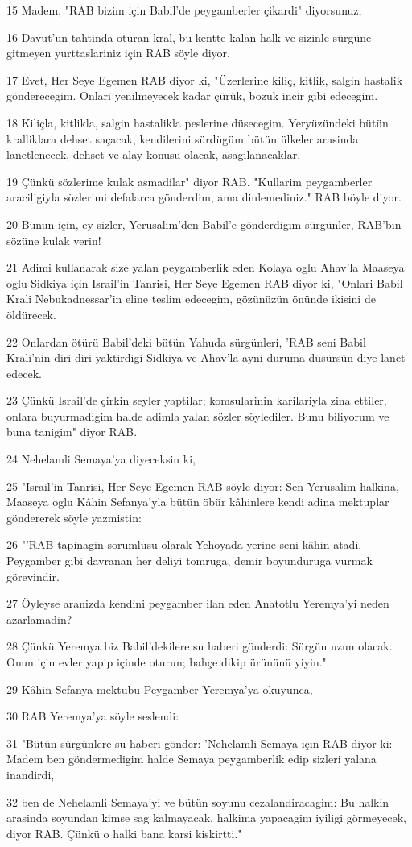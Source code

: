 \par 15 Madem, "RAB bizim için Babil'de peygamberler çikardi" diyorsunuz,
\par 16 Davut'un tahtinda oturan kral, bu kentte kalan halk ve sizinle sürgüne gitmeyen yurttaslariniz için RAB söyle diyor.
\par 17 Evet, Her Seye Egemen RAB diyor ki, "Üzerlerine kiliç, kitlik, salgin hastalik gönderecegim. Onlari yenilmeyecek kadar çürük, bozuk incir gibi edecegim.
\par 18 Kiliçla, kitlikla, salgin hastalikla peslerine düsecegim. Yeryüzündeki bütün kralliklara dehset saçacak, kendilerini sürdügüm bütün ülkeler arasinda lanetlenecek, dehset ve alay konusu olacak, asagilanacaklar.
\par 19 Çünkü sözlerime kulak asmadilar" diyor RAB. "Kullarim peygamberler araciligiyla sözlerimi defalarca gönderdim, ama dinlemediniz." RAB böyle diyor.
\par 20 Bunun için, ey sizler, Yerusalim'den Babil'e gönderdigim sürgünler, RAB'bin sözüne kulak verin!
\par 21 Adimi kullanarak size yalan peygamberlik eden Kolaya oglu Ahav'la Maaseya oglu Sidkiya için Israil'in Tanrisi, Her Seye Egemen RAB diyor ki, "Onlari Babil Krali Nebukadnessar'in eline teslim edecegim, gözünüzün önünde ikisini de öldürecek.
\par 22 Onlardan ötürü Babil'deki bütün Yahuda sürgünleri, 'RAB seni Babil Krali'nin diri diri yaktirdigi Sidkiya ve Ahav'la ayni duruma düsürsün diye lanet edecek.
\par 23 Çünkü Israil'de çirkin seyler yaptilar; komsularinin karilariyla zina ettiler, onlara buyurmadigim halde adimla yalan sözler söylediler. Bunu biliyorum ve buna tanigim" diyor RAB.
\par 24 Nehelamli Semaya'ya diyeceksin ki,
\par 25 "Israil'in Tanrisi, Her Seye Egemen RAB söyle diyor: Sen Yerusalim halkina, Maaseya oglu Kâhin Sefanya'yla bütün öbür kâhinlere kendi adina mektuplar göndererek söyle yazmistin:
\par 26 "'RAB tapinagin sorumlusu olarak Yehoyada yerine seni kâhin atadi. Peygamber gibi davranan her deliyi tomruga, demir boyunduruga vurmak görevindir.
\par 27 Öyleyse aranizda kendini peygamber ilan eden Anatotlu Yeremya'yi neden azarlamadin?
\par 28 Çünkü Yeremya biz Babil'dekilere su haberi gönderdi: Sürgün uzun olacak. Onun için evler yapip içinde oturun; bahçe dikip ürününü yiyin."
\par 29 Kâhin Sefanya mektubu Peygamber Yeremya'ya okuyunca,
\par 30 RAB Yeremya'ya söyle seslendi:
\par 31 "Bütün sürgünlere su haberi gönder: 'Nehelamli Semaya için RAB diyor ki: Madem ben göndermedigim halde Semaya peygamberlik edip sizleri yalana inandirdi,
\par 32 ben de Nehelamli Semaya'yi ve bütün soyunu cezalandiracagim: Bu halkin arasinda soyundan kimse sag kalmayacak, halkima yapacagim iyiligi görmeyecek, diyor RAB. Çünkü o halki bana karsi kiskirtti."

